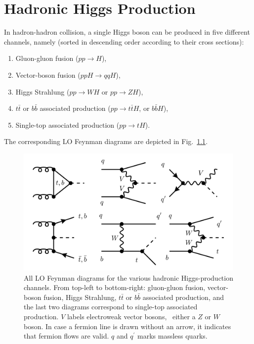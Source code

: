 
\chapter{Hadronic Higgs Production}\label{chap:four}
In hadron-hadron collision, a single Higgs boson can be produced in five different channels, namely (sorted in descending order according to their cross sections):
\begin{enumerate}
  \item Gluon-gluon fusion ($pp \rightarrow H$),
  \item Vector-boson fusion ($ppH \rightarrow qqH$),
  \item Higgs Strahlung ($pp \rightarrow WH$ or $pp \rightarrow Z H$),
  \item $t \bar{t}$ or $b \bar{b}$ associated production ($pp \rightarrow t \bar{t} H$, or $b \bar{b} H$),
  \item Single-top associated production ($pp \rightarrow t H$).
\end{enumerate}
The corresponding \acs{LO} Feynman diagrams are depicted in Fig.~\ref{fig:4:channels}.
\begin{figure}[h]
\centering
\includegraphics[scale=0.38]{Images/channels.pdf}
\caption{All \acs{LO} Feynman diagrams for the various hadronic Higgs-production channels. From top-left to bottom-right: gluon-gluon fusion, vector-boson fusion, Higgs Strahlung, $t \bar{t}$ or $b \bar{b}$ associated production, and the last two diagrams correspond to single-top associated production. $V$ labels electroweak vector bosons, \ie\ either a $Z$ or $W$ boson. In case a fermion line is drawn without an arrow, it indicates that fermion flows are valid. $q$ and $q^\prime$ marks massless quarks.}
\label{fig:4:channels}
\end{figure}
